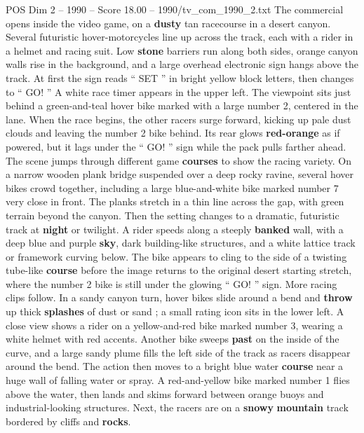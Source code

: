 \begin{textsample}{POS Dim 2 – 1990 – Score 18.00 – 1990/tv\_com\_1990\_2.txt}  \label{ex:f2_pos_037}
The commercial opens inside the video game, on a \textbf{dusty} tan racecourse in a desert canyon.
Several futuristic hover-motorcycles line up across the track, each with a rider in a helmet and racing suit.
Low \textbf{stone} barriers run along both sides, orange canyon walls rise in the background, and a large overhead electronic sign hangs above the track.
At first the sign reads “ SET ” in bright yellow block letters, then changes to “ GO! ” A white race timer appears in the upper left.
The viewpoint sits just behind a green-and-teal hover bike marked with a large number 2, centered in the lane.
When the race begins, the other racers surge forward, kicking up pale dust clouds and leaving the number 2 bike behind.
Its rear glows \textbf{red-orange} as if powered, but it lags under the “ GO! ” sign while the pack pulls farther ahead.
The scene jumps through different game \textbf{courses} to show the racing variety.
On a narrow wooden plank bridge suspended over a deep rocky ravine, several hover bikes crowd together, including a large blue-and-white bike marked number 7 very close in front.
The planks stretch in a thin line across the gap, with green terrain beyond the canyon.
Then the setting changes to a dramatic, futuristic track at \textbf{night} or twilight.
A rider speeds along a steeply \textbf{banked} wall, with a deep blue and purple \textbf{sky}, dark building-like structures, and a white lattice track or framework curving below.
The bike appears to cling to the side of a twisting tube-like \textbf{course} before the image returns to the original desert starting stretch, where the number 2 bike is still under the glowing “ GO! ” sign.
More racing clips follow.
In a sandy canyon turn, hover bikes slide around a bend and \textbf{throw} up thick \textbf{splashes} of dust or sand ; a small rating icon sits in the lower left.
A close view shows a rider on a yellow-and-red bike marked number 3, wearing a white helmet with red accents.
Another bike sweeps \textbf{past} on the inside of the curve, and a large sandy plume fills the left side of the track as racers disappear around the bend.
The action then moves to a bright blue water \textbf{course} near a huge wall of falling water or spray.
A red-and-yellow bike marked number 1 flies above the water, then lands and skims forward between orange buoys and industrial-looking structures.
Next, the racers are on a \textbf{snowy} \textbf{mountain} track bordered by cliffs and \textbf{rocks}.

\end{textsample}
